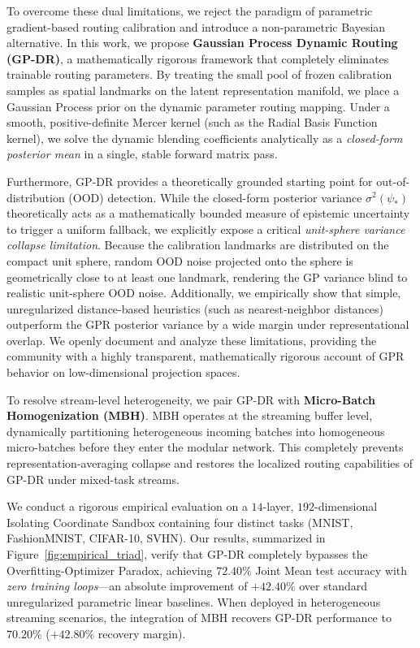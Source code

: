 To overcome these dual limitations, we reject the paradigm of parametric gradient-based routing calibration and introduce a non-parametric Bayesian alternative. In this work, we propose \textbf{Gaussian Process Dynamic Routing (GP-DR)}, a mathematically rigorous framework that completely eliminates trainable routing parameters. By treating the small pool of frozen calibration samples as spatial landmarks on the latent representation manifold, we place a Gaussian Process prior on the dynamic parameter routing mapping. Under a smooth, positive-definite Mercer kernel (such as the Radial Basis Function kernel), we solve the dynamic blending coefficients analytically as a \emph{closed-form posterior mean} in a single, stable forward matrix pass. 

Furthermore, GP-DR provides a theoretically grounded starting point for out-of-distribution (OOD) detection. While the closed-form posterior variance $\sigma^2(\psi_*)$ theoretically acts as a mathematically bounded measure of epistemic uncertainty to trigger a uniform fallback, we explicitly expose a critical \emph{unit-sphere variance collapse limitation}. Because the calibration landmarks are distributed on the compact unit sphere, random OOD noise projected onto the sphere is geometrically close to at least one landmark, rendering the GP variance blind to realistic unit-sphere OOD noise. Additionally, we empirically show that simple, unregularized distance-based heuristics (such as nearest-neighbor distances) outperform the GPR posterior variance by a wide margin under representational overlap. We openly document and analyze these limitations, providing the community with a highly transparent, mathematically rigorous account of GPR behavior on low-dimensional projection spaces.

To resolve stream-level heterogeneity, we pair GP-DR with \textbf{Micro-Batch Homogenization (MBH)}. MBH operates at the streaming buffer level, dynamically partitioning heterogeneous incoming batches into homogeneous micro-batches before they enter the modular network. This completely prevents representation-averaging collapse and restores the localized routing capabilities of GP-DR under mixed-task streams.

We conduct a rigorous empirical evaluation on a $14$-layer, $192$-dimensional Isolating Coordinate Sandbox containing four distinct tasks (MNIST, FashionMNIST, CIFAR-10, SVHN). Our results, summarized in Figure~\ref{fig:empirical_triad}, verify that GP-DR completely bypasses the Overfitting-Optimizer Paradox, achieving $72.40\%$ Joint Mean test accuracy with \emph{zero training loops}---an absolute improvement of $+42.40\%$ over standard unregularized parametric linear baselines. When deployed in heterogeneous streaming scenarios, the integration of MBH recovers GP-DR performance to $70.20\%$ ($+42.80\%$ recovery margin).

